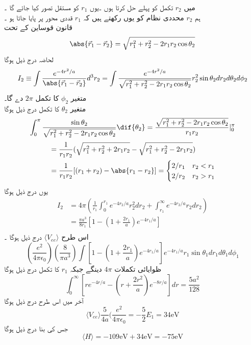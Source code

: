 میں 
\(r_{2}\)
 تکمل کو پہلے حل کرتا ہوں ۔یوں
  \(r_{1}\)
کو مستقل تصور کیا جائے گا ۔\\
ہم 
\(r_{2}\)
 محددی نظام کو یوں رکھتے ہیں کہ
 \(r_{1}\)
  قددی محور پر پایا جاتا ہو ۔\\
قانون قوساین کے تحت 
\[\abs{\vec{r}_{1}-\vec{r}_{2}}=\sqrt{r_{1}^{2}+r_{2}^{2}-2r_{1}r_{2}\cos{\theta_{2}}}\]
لحاضہ درج ذیل ہوگا \\
\[I_{2}\equiv\int\frac{e^{-4r^{2}/a}}{\abs{\vec{r}_{1}-\vec{r}_{2}}}d^{3}r_{2}=\int\frac{e^{-4r^{2}/a}}{\sqrt{r_{1}^{2}+r_{2}^{2}-2r_{1}r_{2}\cos{\theta_{2}}}}r_{2}^{2}\sin{\theta_{2}}dr_{2}d\theta_{2}d\phi_{2}\]
متغیر 
\(\phi_{2}\)
کا تکمل 
\(2\pi\)
 دے گا۔\\
متغیر 
\(\theta_{2}\)
 کا تکمل  درج ذیل ہوگا
\begin{align*}
\int_{0}^{\pi}\frac{\sin{\theta_{2}}}{\sqrt{r_{1}^{2}+r_{2}^{2}-2r_{1}r_{2}\cos{\theta_{2}}}}\dif{\theta_{2}}=\frac{\sqrt{r_{1}^{2}+r_{2}^{2}-2r_{1}r_{2}\cos{\theta_{2}}}}{r_{1}r_{2}}|_{0}^{\pi}
\end{align*}
\begin{align*}
&=\frac{1}{r_{1}r_{2}}(\sqrt{r_{1}^{2}+r_{2}^{2}+2r_{1}r_{2}}-\sqrt{r_{1}^{2}+r_{2}^{2}-2r_{1}r_{2}})\\
&=\frac{1}{r_{1}r_{2}}[(r_{1}+r_{2})-\abs{r_{1}-r_{2}}]=\begin{cases}
2/r_{1} & r_{2}<r_{1}\\
2/r_{2}&r_{2}>r_{1}\\
\end{cases}\\
\end{align*}
یوں درج ذیل ہوگا 
\begin{align*}
I_{2}&=4\pi(\frac{1}{r_{1}}\int_{0}^{r_{1}}e^{-4r_{2}/a}r_{2}^{2}dr_{2}+\int_{r_{1}}^{\infty}e^{-4r_{2}/a}r_{2}dr_{2})\\
&=\frac{\pi a^{3}}{8r_{1}}[1-(1+\frac{2r_{1}}{a})e^{-4r_{1}/a}]\\
\end{align*}
اس طرح 
\(\langle V_{ee} \rangle \)
درج ذیل ہوگا ۔
\[(\frac{e^{2}}{4\pi\epsilon_{0}})(\frac{8}{\pi a^{3}})\int[1-(1+\frac{2r_{1}}{a})e^{-4r_{1}/a}]e^{-4r_{1}/a}r_{1}\sin{\theta_{1}}dr_{1}d\theta_{1}d\phi_{1}\]
ظوایائی تکملات 
\(4\pi\)
دینگے جبکہ 
\(r_{1}\)
 کا تکمل درج ذیل ہوگا
\[\int_{0}^{\infty}[re^{-4r/a}-(r+\frac{2r^{2}}{a})e^{-8r/a}]dr=\frac{5a^{2}}{128}\]
آخر میں اس طرح درج ذیل ہوگا 
\[\langle V_{ee} \rangle\frac{5}{4a}(\frac{e^{2}}{4\pi\epsilon_{0}}=-\frac{5}{2}E_{1}=34\text{eV}\]
جس کی بنا درج ذیل ہوگا 
\[\langle H \rangle =-109 \text{eV}+34 \text{eV}=-75\text{eV}\]
